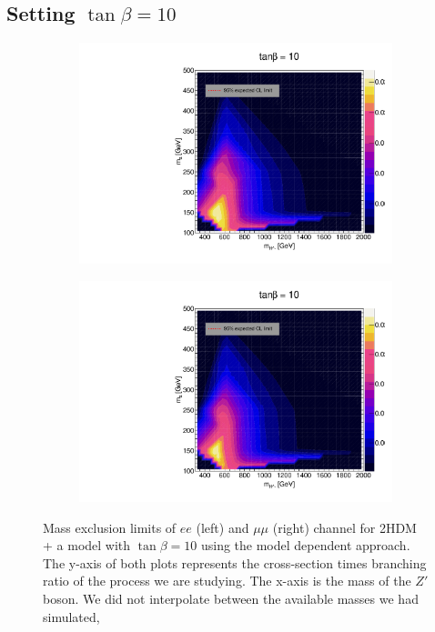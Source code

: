\documentclass[12pt, a4paper]{book}
\begin{document}
\clearpage
\subsection{Setting $\tan\beta=10$}
\begin{figure}[!ht]
	\centering
   \begin{subfigure}[b]{0.49\textwidth}
      \centering
      \includegraphics[width=1\textwidth]{Limits/2HDM/2HDM_ee_tb10.pdf}
      \end{subfigure}
   \hfill
   \begin{subfigure}[b]{0.49\textwidth}
      \centering
      \includegraphics[width=1\textwidth]{Limits/2HDM/2HDM_uu_tb10.pdf}
      \end{subfigure}
   \caption[Expected mass exclusion limits of $ee$ and $\mu\mu$ channel for all 2HDM + a model with $\tan\beta=10$ using the model dependent approach]{Mass exclusion limits of $ee$ (left) and $\mu\mu$ (right) channel for 2HDM + a model with $\tan\beta=10$ using the model dependent approach. The y-axis of both plots represents the cross-section times branching ratio of the process we are studying. The x-axis is the mass of the $Z'$ boson. We did not interpolate between the available masses we had simulated, 
}
\end{figure}
\end{document}
